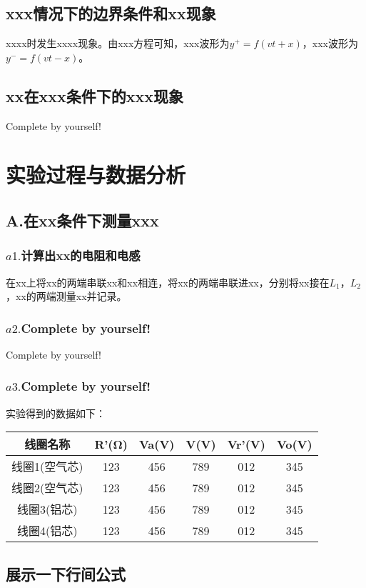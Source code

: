 \documentclass[UTF8]{ctexart}
\begin{document}
\subsection{xxx情况下的边界条件和xx现象}
xxxx时发生xxxx现象。由xxx方程可知，xxx波形为$y^+=f(vt+x)$，xxx波形为$y^-=f(vt-x)$。

\subsection{xx在xxx条件下的xxx现象}
Complete by yourself!


\section{实验过程与数据分析}
\subsection{A.在xx条件下测量xxx}
\subsubsection{$a1. $计算出xx的电阻和电感}
在xx上将xx的两端串联xx和xx相连，将xx的两端串联进xx，分别将xx接在$L_1$，$L_2$，xx的两端测量xx并记录。
\subsubsection{$a2. $Complete by yourself!}
Complete by yourself!
\subsubsection{$a3. $Complete by yourself!}
实验得到的数据如下：

\begin{center}
\begin{tabular}{|c|c|c|c|c|c|}
 \hline
线圈名称 & R'(Ω) & Va(V) & V(V) & Vr'(V) & Vo(V)\\
 \hline
线圈1(空气芯) & 123 & 456 & 789 & 012 & 345\\
 \hline
线圈2(空气芯) & 123 & 456 & 789 & 012 & 345\\
 \hline
线圈3(铝芯) & 123 & 456 & 789 & 012 & 345\\
 \hline
线圈4(铝芯) & 123 & 456 & 789 & 012 & 345\\
 \hline
\end{tabular}
\end{center}

\subsection{展示一下行间公式}
\end{document}
